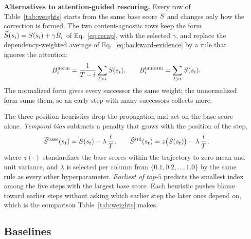 
\textbf{Alternatives to attention-guided rescoring.}
Every row of Table~\ref{tab:weights} starts from the same base score $S$ and
changes only how the correction is formed. The two content-agnostic rows keep the
form $\widetilde{S}(s_i)=S(s_i)+\gamma B_i$ of Eq.~\ref{eq:recap}, with the selected
$\gamma$, and replace the dependency-weighted average of
Eq.~\ref{eq:backward-evidence} by a rule that ignores the attention:
\begin{equation}
\small
    B_i^{\mathrm{norm}}
    =
    \frac{1}{T-i}\sum_{t>i}S(s_t),
    \qquad
    B_i^{\mathrm{unnorm}}
    =
    \sum_{t>i}S(s_t).
    \label{eq:uniform-alt}
\end{equation}
The normalized form gives every successor the same weight; the unnormalized form
sums them, so an early step with many successors collects more. 

The three position
heuristics drop the propagation and act on the base score alone. \emph{Temporal
bias} subtracts a penalty that grows with the position of the step,
\begin{equation}
\small
    \widetilde{S}^{\mathrm{base}}(s_t)
    =
    S(s_t)-\lambda\,\frac{t}{T},
    \qquad
    \widetilde{S}^{\mathrm{std}}(s_t)
    =
    z\bigl(S(s_t)\bigr)-\lambda\,\frac{t}{T},
    \label{eq:temporal-alt}
\end{equation}
where $z(\cdot)$ standardizes the base scores within the trajectory to zero mean and
unit variance, and $\lambda$ is selected per column from $\{0.1, 0.2, \ldots, 1.0\}$
by the same rule as every other hyperparameter. \emph{Earliest of top-$5$} predicts
the smallest index among the five steps with the largest base score. Each heuristic
pushes blame toward earlier steps without asking which earlier step the later ones
depend on, which is the comparison Table~\ref{tab:weights} makes.


\subsection{Baselines}
\label{app:baselines}


